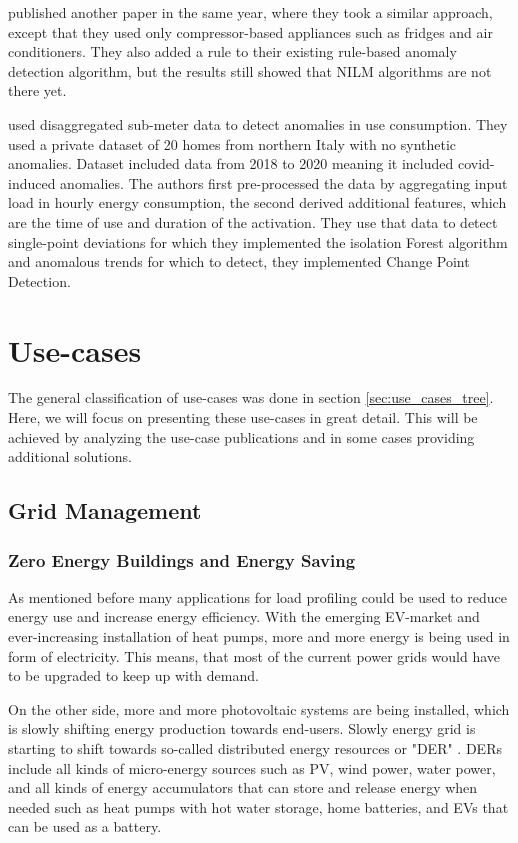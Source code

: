 \cite{NILMAD22019} published another paper in the same year, where they took a similar approach, except that they used 
only compressor-based appliances such as fridges and air conditioners. They also added a rule to their existing rule-based anomaly 
detection algorithm, but the results still showed that NILM algorithms are not there yet. 

\cite{Castangia2021} used disaggregated sub-meter data to detect anomalies in use consumption.
They used a private dataset of 20 homes from northern Italy with no synthetic anomalies. 
Dataset included data from 2018 to 2020 meaning it included covid-induced anomalies. 
The authors first pre-processed the data by aggregating input load in hourly energy consumption, 
the second derived additional features, which are the time of use and duration of the activation.
They use that data to detect single-point deviations for which they implemented the isolation Forest algorithm and
anomalous trends for which to detect, they implemented Change Point Detection. 

\section{Use-cases}
\label{sec:use-cases}

The general classification of use-cases was done in section \ref{sec:use_cases_tree}. 
Here, we will focus on presenting these use-cases in great detail.
This will be achieved by analyzing the use-case publications and in some cases providing additional solutions.

\subsection{Grid Management}

\subsubsection{Zero Energy Buildings and Energy Saving}

As mentioned before many applications for load profiling could be used to reduce energy use and increase energy efficiency. 
With the emerging EV-market and ever-increasing installation of heat pumps, more and more energy is being used in form of electricity. 
This means, that most of the current power grids would have to be upgraded to keep up with demand.

On the other side, more and more photovoltaic systems are being installed,
which is slowly shifting energy production towards end-users.
Slowly energy grid is starting to shift towards so-called distributed energy resources or "DER" \cite{MORENOJARAMILLO2021445}.
DERs include all kinds of micro-energy sources such as PV, wind power, water power, and all kinds of energy accumulators that can store 
and release energy when needed such as heat pumps with hot water storage, home batteries, and EVs that can be used as a battery.

